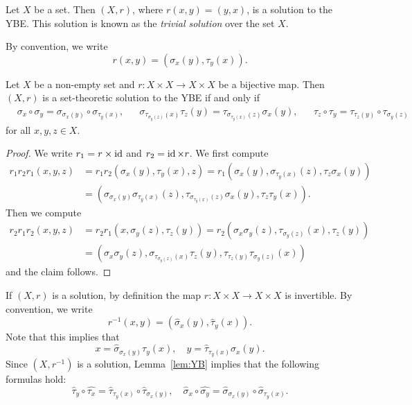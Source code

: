 \begin{example}
Let $X$ be a set. Then $(X,r)$, where $r(x,y)=(y,x)$, is a solution to the YBE. This solution 
is known as the \emph{trivial solution} over the set $X$. 
\end{example}

By convention, we write
\[
r(x,y)=(\sigma_x(y),\tau_y(x)).
\]

\begin{lemma}
    \label{lem:YB}
    Let $X$ be a non-empty set and $r\colon X\times X\to X\times X$ be a bijective map.
    Then $(X,r)$ is a set-theoretic solution to the YBE if and only if 
    \begin{align*}
        &\sigma_x\circ\sigma_y = \sigma_{\sigma_x(y)}\circ\sigma_{\tau_y(x)},&
        &\sigma_{\tau_{\sigma_y(z)}(x)}\tau_z(y)=\tau_{\sigma_{\tau_y(x)}(z)}\sigma_x(y),&
        &\tau_z\circ\tau_y=\tau_{\tau_z(y)}\circ\tau_{\sigma_y(z)}
    \end{align*}
    for all $x,y,z\in X$. 
\end{lemma}

\begin{proof}
    We write $r_1=r\times\operatorname{id}$ and $r_2=\operatorname{id}\times r$. We first compute
    \begin{align*}
        r_1r_2r_1(x,y,z)&=r_1r_2(\sigma_x(y),\tau_y(x),z)
        =r_1(\sigma_x(y),\sigma_{\tau_y(x)}(z),\tau_z\sigma_x(y))\\
        &=\left(\sigma_{\sigma_x(y)}\sigma_{\tau_y(x)}(z),\tau_{\sigma_{\tau_y(x)}(z)}\sigma_x(y),\tau_z\tau_y(x)\right).
    \end{align*}
    Then we compute
    \begin{align*}
        r_2r_1r_2(x,y,z)&=r_2r_1(x,\sigma_y(z),\tau_z(y))
        =r_2(\sigma_x\sigma_y(z),\tau_{\sigma_y(z)}(x),\tau_z(y))\\
        &=\left(\sigma_x\sigma_y(z),\sigma_{\tau_{\sigma_y(z)}(x)}\tau_z(y),\tau_{\tau_z(y)}\tau_{\sigma_y(z)}(x)\right)
    \end{align*}
    and the claim follows.    
\end{proof}

If $(X,r)$ is a solution, by definition the map $r\colon X\times X\to X\times X$ is 
invertible. By convention, we write 
 \[
 r^{-1}(x,y)=(\widehat{\sigma}_x(y),\widehat{\tau}_y(x)).
 \]
 Note that this implies that
 \[
 x=\widehat{\sigma}_{\sigma_x(y)}\tau_y(x),\quad
 y=\widehat{\tau}_{\tau_y(x)}\sigma_x(y).
 \]
 Since $(X,r^{-1})$ is a solution, Lemma~\ref{lem:YB} implies that 
 the following formulas hold:
 \[
 \widehat{\tau}_y\circ\widehat{\tau_x}=\widehat{\tau}_{\tau_y(x)}\circ\widehat{\tau}_{\sigma_x(y)},
 \quad
 \widehat{\sigma}_x\circ\widehat{\sigma_y}=\widehat{\sigma}_{\sigma_x(y)}\circ\widehat{\sigma}_{\tau_y(x)}.
 \]

